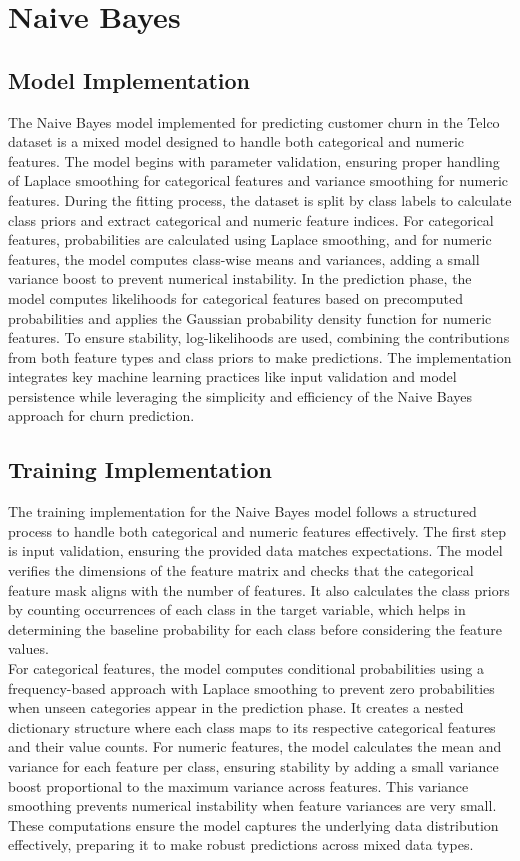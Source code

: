 \section{Naive Bayes}
\subsection{Model Implementation}
The Naive Bayes model implemented for predicting customer churn in the Telco dataset is a mixed model designed to handle both categorical and numeric features. The model begins with parameter validation, ensuring proper handling of Laplace smoothing for categorical features and variance smoothing for numeric features. During the fitting process, the dataset is split by class labels to calculate class priors and extract categorical and numeric feature indices. For categorical features, probabilities are calculated using Laplace smoothing, and for numeric features, the model computes class-wise means and variances, adding a small variance boost to prevent numerical instability. In the prediction phase, the model computes likelihoods for categorical features based on precomputed probabilities and applies the Gaussian probability density function for numeric features. To ensure stability, log-likelihoods are used, combining the contributions from both feature types and class priors to make predictions. The implementation integrates key machine learning practices like input validation and model persistence while leveraging the simplicity and efficiency of the Naive Bayes approach for churn prediction.

\subsection{Training Implementation}
The training implementation for the Naive Bayes model follows a structured process to handle both categorical and numeric features effectively. The first step is input validation, ensuring the provided data matches expectations. The model verifies the dimensions of the feature matrix and checks that the categorical feature mask aligns with the number of features. It also calculates the class priors by counting occurrences of each class in the target variable, which helps in determining the baseline probability for each class before considering the feature values.\\

For categorical features, the model computes conditional probabilities using a frequency-based approach with Laplace smoothing to prevent zero probabilities when unseen categories appear in the prediction phase. It creates a nested dictionary structure where each class maps to its respective categorical features and their value counts. For numeric features, the model calculates the mean and variance for each feature per class, ensuring stability by adding a small variance boost proportional to the maximum variance across features. This variance smoothing prevents numerical instability when feature variances are very small. These computations ensure the model captures the underlying data distribution effectively, preparing it to make robust predictions across mixed data types.

